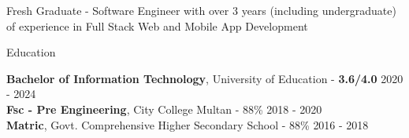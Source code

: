 \documentclass{resume} %
\begin{document}

\begin{rSection}%

{Fresh Graduate - Software Engineer with over 3 years (including undergraduate) of experience in Full Stack Web and Mobile App Development}


\end{rSection}

\begin{rSection}{Education}


{\bf Bachelor of Information Technology}, University of Education - {\bf 3.6/4.0 }\hfill {2020 - 2024} 
\\
{\bf Fsc  - Pre Engineering}, City College Multan - 88\% \hfill {2018 - 2020}
\\
{\bf Matric}, Govt. Comprehensive Higher Secondary School - 88\% \hfill {2016 - 2018}


\end{rSection}
\end{document}
